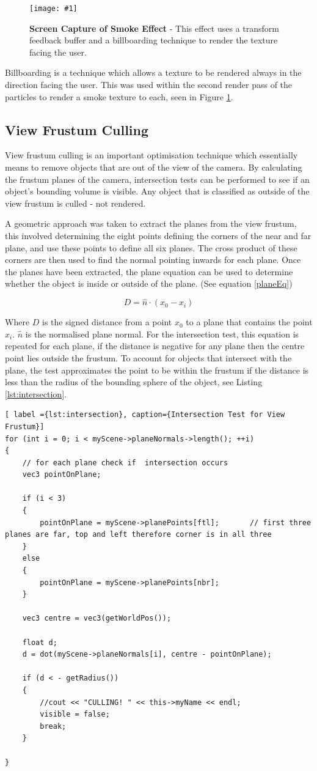 \documentclass[conference]{acmsiggraph}
\newcommand{\figuremacroW}[4]{
	\begin{figure}[h] %
		\centering
		\texttt{[image: \#1]}
		\caption[#2]{\textbf{#2} - #3}
		\label{fig:#1}
	\end{figure}
}
\begin{document}
\figuremacroW
{billboards}
{Screen Capture of Smoke Effect}
{This effect uses a transform feedback buffer and a billboarding technique to render the texture facing the user.}
{1.0}

Billboarding is a technique which allows a texture to be rendered always in the direction facing the user. This was used within the second render pass of the particles to render a smoke texture to each, seen in Figure \ref{fig:billboards}.


\subsection{View Frustum Culling}
View frustum culling is an important optimisation technique which essentially means to remove objects that are out of the view of the camera. By calculating the frustum planes of the camera, intersection tests can be performed to see if an object's bounding volume is visible. Any object that is classified as outside of the view frustum is culled - not rendered.

A geometric approach was taken to extract the planes from the view frustum, this involved determining the eight points defining the corners of the near and far plane, and use these points to define all six planes. \cite{lighthouse} The cross product of these corners are then used to find the normal pointing inwards for each plane. Once the planes have been extracted, the plane equation can be used to determine whether the object is inside or outside of the plane. (See equation \ref{planeEq})

\begin{equation} \label{planeEq}
D = \hat{n}\cdot(x_0-x_i)
\end{equation}

Where $D$ is the signed distance from a point $x_0$ to a plane that contains the point $x_i$. $\hat{n}$ is the normalised plane normal. For the intersection test, this equation is repeated for each plane, if the distance is negative for any plane then the centre point lies outside the frustum. To account for objects that intersect with the plane, the test approximates the point to be within the frustum if the distance is less than the radius of the bounding sphere of the object, see Listing \ref{lst:intersection}.

\begin{lstlisting}[ label ={lst:intersection}, caption={Intersection Test for View Frustum}]
for (int i = 0; i < myScene->planeNormals->length(); ++i) 
{
	// for each plane check if 	intersection occurs
	vec3 pointOnPlane;

	if (i < 3)
	{
		pointOnPlane = myScene->planePoints[ftl];		// first three planes are far, top and left therefore corner is in all three
	}
	else
	{
		pointOnPlane = myScene->planePoints[nbr];
	}

	vec3 centre = vec3(getWorldPos());

	float d;
	d = dot(myScene->planeNormals[i], centre - pointOnPlane);

	if (d < - getRadius())
	{
		//cout << "CULLING! " << this->myName << endl;
		visible = false;
		break;
	}

}
\end{lstlisting}
\end{document}
